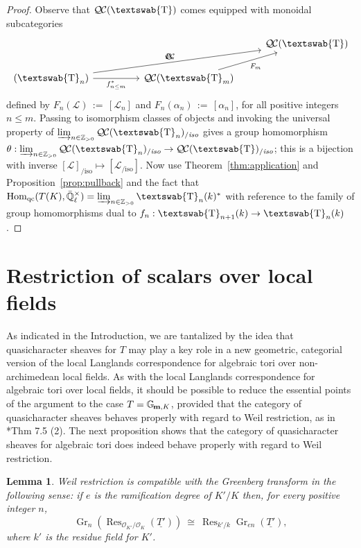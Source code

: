 \documentclass[11pt]{amsart}
\newcommand{\mathswab}[1]{\operatorname{\textswab{#1}}}
\theoremstyle{plain}
\newtheorem{lemma}[theorem]{Lemma}
\theoremstyle{definition}
\theoremstyle{remark}
\newcommand{\ZZ}{{\mathbb{Z}}}
\newcommand{\EE}{\mathbb{\bar Q}_\ell}
\newcommand{\OK}{\mathcal{O}_K}
\newcommand{\Fq}{k}
\newcommand{\EEx}{\EE^\times}
\DeclareMathOperator{\Hom}{Hom}
\DeclareMathOperator{\Gr}{Gr}
\DeclareMathOperator{\Res}{Res}
\newcommand{\ceq}{{\, :=\, }}
\newcommand{\iso}{{\ \cong\ }}
\newcommand{\Gm}[1]{\mathbb{G}_{\hskip-1pt\textbf{m},#1}}
\newcommand{\GN}[1]{\mathswab{#1}}
\newcommand{\qcs}[1]{{\mathcal{#1}}}
\newcommand{\QC}{{\mathcal{Q\hskip-0.8pt C}}}
\newcommand{\QCiso}[1]{\QC(#1)_{/\textit{iso}}}
\begin{document}
\begin{proof}
Observe that $\QC(\GN{T})$ comes equipped with monoidal subcategories
\[
\begin{tikzcd}
\ & & & \QC(\GN{T})\\
\arrow{urrr}{F_n} \QC(\GN{T}_n) \arrow[swap]{rr}{f_{n\leq m}^*} && \QC(\GN{T}_m) \arrow[swap]{ur}{F_m} & 
\end{tikzcd}
\]
defined by $F_n(\qcs{L}) \ceq [\qcs{L}_n]$ and $F_n(\alpha_n) \ceq [\alpha_n]$, 
for all positive integers $n\leq m$.
Passing to isomorphism classes of objects and invoking the 
universal property of $\varinjlim_{n\in \ZZ_{>0}} \QCiso{\GN{T}_n}$ 
gives a group homomorphism
$\theta: \varinjlim_{n\in \ZZ_{>0}} \QCiso{\GN{T}_n} \to \QCiso{\GN{T}}$; 
this is a bijection  with inverse $[\qcs{L}]_{/\text{iso}} \mapsto [\qcs{L}_{/\text{iso}}]$.
Now use Theorem~\ref{thm:application} and Proposition~\ref{prop:pullback} 
and the fact that  $\Hom_{\text{qc}}(T(K),\EEx) = \varinjlim_{n\in \ZZ_{>0}} \GN{T}_n(k)^*$ 
with reference to the family of group homomorphisms 
dual to $f_{n} : \GN{T}_{n+1}(\Fq) \to \GN{T}_n(\Fq)$.
\end{proof}


\section{Restriction of scalars over local fields}
\label{sec:wrK}

As indicated in the Introduction, we are tantalized 
by the idea that quasicharacter sheaves for $T$ 
may play a key role in a new geometric, categorial version 
of the local Langlands correspondence for algebraic tori 
over non-archimedean local fields. 
As with the local Langlands correspondence for algebraic tori over local fields, 
it should be possible to reduce the essential points of the argument to the case $T= \Gm{K}$,
provided that the category of quasicharacter sheaves behaves properly with regard to
Weil restriction, as in \cite{yu:09a}*{Thm 7.5 (2)}. 
The next proposition shows that the category of quasicharacter sheaves for 
algebraic tori does indeed behave properly with regard to Weil restriction.

\begin{lemma}\label{lemma:wrK}
Weil restriction is compatible with the Greenberg transform in the following sense: 
if $e$ is the ramification degree of $K'/K$ then, for every positive integer $n$,
\begin{equation}%
\Gr_{n}\left( \Res_{\mathcal{O}_{K'}/\OK}(\underline{T'})\right)
\iso
\Res_{k'/k} \Gr_{en}(\underline{T'}),
\end{equation}
where $k'$ is the residue field for $K'$.
\end{lemma}
\end{document}
